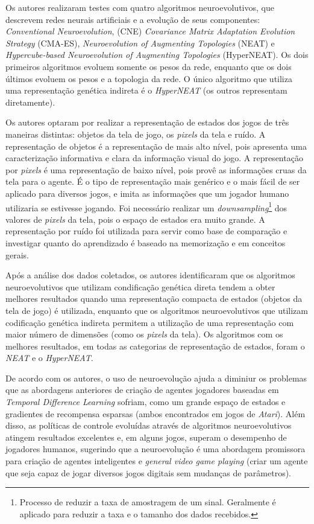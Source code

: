 Os autores realizaram testes com quatro algoritmos neuroevolutivos, que
descrevem redes neurais artificiais e a evolução de seus componentes:
\textit{Conventional Neuroevolution}, (CNE) \textit{Covariance Matrix Adaptation
Evolution Strategy} (CMA-ES), \textit{Neuroevolution of Augmenting Topologies}
(NEAT) e \textit{Hypercube-based Neuroevolution of Augmenting Topologies}
(HyperNEAT). Os dois primeiros algoritmos evoluem somente os pesos da rede,
enquanto que os dois últimos evoluem os pesos e a topologia da rede. O único
algoritmo que utiliza uma representação genética indireta é o \textit{HyperNEAT}
(os outros representam diretamente).

Os autores optaram por realizar a representação de estados dos jogos de três
maneiras distintas: objetos da tela de jogo, os \textit{pixels} da tela e ruído.
A representação de objetos é a representação de mais alto nível, pois apresenta
uma caracterização informativa e clara da informação visual do jogo. A
representação por \textit{pixels} é uma representação de baixo nível, pois provê
as informações cruas da tela para o agente. É o tipo de representação mais
genérico e o mais fácil de ser aplicado para diversos jogos, e imita as
informações que um jogador humano utilizaria se estivesse jogando.  Foi
necessário realizar um \textit{downsampling}\footnote{Processo de reduzir a taxa
de amostragem de um sinal. Geralmente é aplicado para reduzir a taxa e o tamanho
dos dados recebidos.} dos valores de \textit{pixels} da tela, pois o espaço de
estados era muito grande. A representação por ruído foi utilizada para servir
como base de comparação e investigar quanto do aprendizado é baseado na
memorização e em conceitos gerais.

Após a análise dos dados coletados, os autores identificaram que os algoritmos
neuroevolutivos que utilizam condificação genética direta tendem a obter
melhores resultados quando uma representação compacta de estados (objetos da
tela de jogo) é utilizada, enquanto que os algoritmos neuroevolutivos que
utilizam codificação genética indireta permitem a utilização de uma
representação com maior número de dimensões (como os \textit{pixels} da tela).
Os algoritmos com os melhores resultados, em todas as categorias de
representação de estados, foram o \textit{NEAT} e o \textit{HyperNEAT}.

De acordo com os autores, o uso de neuroevolução ajuda a diminiur os problemas
que as abordagens anteriores de criação de agentes jogadores baseadas em
\textit{Temporal Difference Learning} sofriam, como um grande espaço de estados
e gradientes de recompensa esparsas (ambos encontrados em jogos de
\textit{Atari}). Além disso, as políticas de controle evoluídas através de
algoritmos neuroevolutivos atingem resultados excelentes e, em alguns jogos,
superam o desempenho de jogadores humanos, sugerindo que a neuroevolução é uma
abordagem promissora para criação de agentes inteligentes e \textit{general
video game playing} (criar um agente que seja capaz de jogar diversos jogos
digitais sem mudanças de parâmetros).


